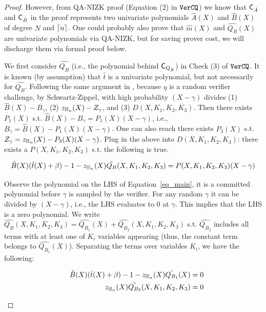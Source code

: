 \begin{proof}
However, from QA-NIZK proof (Equation (2) in ${\texttt{VerCQ}}$)
we know that ${{\mathsf{C}}_{\hat{A}}}$ and ${{\mathsf{C}}_{\hat{B}}}$ in the proof represents two univariate polynomials
$\hat{A}(X)$ and $\hat{B}(X)$ of degree $N$ and ${\lceil{n}\rceil}$.
One could probably also prove that 
$\hat{m}(X)$ and $\hat{Q_B}(X)$ are univariate polynomials via
QA-NIZK, but for saving prover cost, we
will discharge them via formal proof below.

We first consider $\hat{Q_B}$ (i.e., the polynomial
behind ${{\mathsf{C}}_{Q_{\hat{B}}}}$) in Check (3) of ${\texttt{VerCQ}}$. 
It is known (by assumption) that $\hat{t}$ is a univariate polynomial,
but not necessarily for $\hat{Q_B}$.
Following the same argument
in \cite{MatrixLookup}, because $\eta$ is a random verifier
challenge, by Schwartz-Zippel, with high probability
$(X-\gamma)$ divides (1) $\hat{B}(X) - B_\gamma$, 
(2) $z_{\mathbb{H}_{n}}(X) - Z_\gamma$, and (3) $D(X,K_1,K_2,K_3)$.
Then there exists $P_1(X)$ s.t. $\hat{B}(X) - B_\gamma = P_1(X) (X-\gamma)$,
i.e., $B_\gamma = \hat{B}(X) - P_1(X) (X - \gamma)$.
One can also reach there exists $P_3(X)$ s.t.
$Z_\gamma = z_{\mathbb{H}_{n}}(X) - P_3(X)(X-\gamma)$. Plug in the above
into $D(X,K_1,K_2,K_3)$: there exists a $P(X,K_1,K_2,K_3)$ s.t.
the following is true.

\begin{footnotesize}
\begin{equation} \label{eq_main}
\hat{B}(X)(\hat{t}(X)  + \beta) -1 -z_{\mathbb{H}_{n}}(X)\hat{Q_B}(X, K_1, K_2, K_3)
 = P(X,K_1,K_2,K_3)(X-\gamma)
\end{equation}
\end{footnotesize}

Observe the polynomial on the LHS of Equation\ \ref{eq_main}, it is a
committed polynomial before $\gamma$ is sampled by the verifier.
For any random $\gamma$ it can be divided by $(X-\gamma)$, i.e.,
the LHS evaluates to $0$ at $\gamma$. This implies that
the LHS is a zero polynomial. 
We write $\hat{Q_B}(X, K_1, K_2, K_3) =
 \hat{Q_{B_1}}(X) + 
 \hat{Q_{B_2}}(X,K_1,K_2,K_3)$ s.t.
 $\hat{Q_{B_2}}$ includes all terms with at least one of 
 $K_i$ variables appearing (thus, the constant term belongs to
 $\hat{Q_{B_1}}(X)$). Separating the terms over variables
 $K_i$, we have the following:

\begin{small}
\begin{eqnarray} \label{eq_a1}
& &\hat{B}(X)(\hat{t}(X) + \beta) - 1 - z_{\mathbb{H}_{n}}(X) \hat{Q_{B_1}}(X) = 0 
\label{eq_b1} \\
& &z_{\mathbb{H}_{n}}(X) \hat{Q_{B_2}}(X,K_1,K_2,K_3) = 0
\label{eq_b2} 
\end{eqnarray}
\end{small}


\end{proof}

